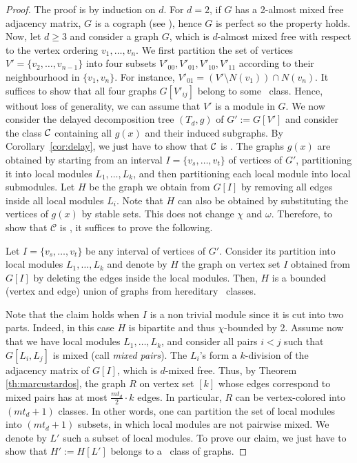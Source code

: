 \begin{proof}
The proof is by induction on $d$. For $d=2$, if $G$ has a 2-almost mixed free adjacency matrix, $G$ is a cograph (see \cite{PS22}), hence $G$ is perfect so the property holds. Now, let $d \geq 3$ and consider a graph $G$, which is $d$-almost mixed free with respect to the vertex ordering $v_1,\ldots ,v_n$. We first partition the set of vertices $V' =\{v_2,\dots, v_{n-1}\}$ into four subsets $V'_{00},V'_{01},V'_{10},V'_{11}$ according to their neighbourhood in $\{v_1,v_n\}$. For instance, $V'_{01}=(V'\setminus N(v_1))\cap N(v_n)$. It suffices to show that all four graphs $G[V'_{ij}]$ belong to some \pcb~class. Hence, without loss of generality, we can assume that $V'$ is a module in $G$. 
    We now consider the delayed decomposition tree $(T_d,g)$ of $G':=G[V']$ and consider the class $\cal C$ containing all $g(x)$ and their induced subgraphs. By Corollary~\ref{cor:delay}, we just have to show that $\cal C$ is \pcb. The graphs $g(x)$ are obtained by starting from an interval $I=\{v_s,\dots, v_t\}$ of vertices of $G'$, partitioning it into local modules $L_1,\dots, L_k$, and then partitioning each local module into local submodules. Let $H$ be the graph we obtain from $G[I]$ by removing all edges inside all local modules $L_i$. Note that $H$ can also be obtained by substituting the vertices of $g(x)$ by stable sets. This does not change $\chi$ and $\omega$. Therefore, to show that $\mathcal{C}$ is \pcb, it suffices to prove the following.

\begin{claim} Let $I=\{v_s,\dots, v_t\}$ be any interval of vertices of $G'$. Consider its partition into local modules $L_1,\dots, L_k$ and denote by $H$ the graph on vertex set $I$ obtained from $G[I]$ by deleting the edges inside the local modules. Then, $H$ is a bounded (vertex and edge) union of graphs from hereditary \pcb~classes.
\end{claim}

Note that the claim holds when $I$ is a non trivial module since it is cut into two parts. Indeed, in this case $H$ is bipartite and thus $\chi$-bounded by 2. Assume now that we have local modules $L_1,\dots ,L_k$, and consider all pairs $i<j$ such that $G[L_i,L_j]$ is mixed (call \emph{mixed pairs}). The $L_i$'s form a $k$-division of the adjacency matrix of $G[I]$, which is $d$-mixed free. Thus, by Theorem \ref{th:marcustardos}, the graph $R$ on vertex set $[k]$ whose edges correspond to mixed pairs has at most $\frac{mt_d}{2} \cdot k$ edges. In particular, $R$ can be vertex-colored into $(mt_d+1)$ classes. In other words, one can partition the set of local modules into $(mt_d+1)$ subsets, in which local modules are not pairwise mixed. We denote by $L'$ such a subset of local modules. To prove our claim, we just have to show that $H':=H[L']$ belongs to a \pcb~class of graphs.


\end{proof}
